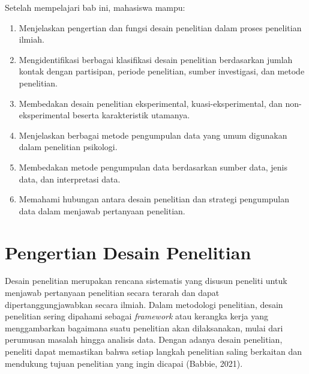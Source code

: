 \documentclass[
  indonesian,
  letterpaper,
  DIV=11,
  numbers=noendperiod]{scrreprt}
\providecommand{\tightlist}{%
  \setlength{\itemsep}{0pt}\setlength{\parskip}{0pt}}
\begin{document}
\begin{tcolorbox}[enhanced jigsaw, colframe=quarto-callout-note-color-frame, toptitle=1mm, breakable, leftrule=.75mm, arc=.35mm, toprule=.15mm, colback=white, colbacktitle=quarto-callout-note-color!10!white, bottomtitle=1mm, bottomrule=.15mm, titlerule=0mm, title=\textcolor{quarto-callout-note-color}{\faInfo}\hspace{0.5em}{Capaian Pembelajaran}, coltitle=black, left=2mm, opacitybacktitle=0.6, opacityback=0, rightrule=.15mm]

Setelah mempelajari bab ini, mahasiswa mampu:

\begin{enumerate}
\def\labelenumi{\arabic{enumi}.}
\tightlist
\item
  Menjelaskan pengertian dan fungsi desain penelitian dalam proses
  penelitian ilmiah.
\item
  Mengidentifikasi berbagai klasifikasi desain penelitian berdasarkan
  jumlah kontak dengan partisipan, periode penelitian, sumber
  investigasi, dan metode penelitian.
\item
  Membedakan desain penelitian eksperimental, kuasi-eksperimental, dan
  non-eksperimental beserta karakteristik utamanya.
\item
  Menjelaskan berbagai metode pengumpulan data yang umum digunakan dalam
  penelitian psikologi.
\item
  Membedakan metode pengumpulan data berdasarkan sumber data, jenis
  data, dan interpretasi data.
\item
  Memahami hubungan antara desain penelitian dan strategi pengumpulan
  data dalam menjawab pertanyaan penelitian.
\end{enumerate}

\end{tcolorbox}

\section{Pengertian Desain
Penelitian}\label{pengertian-desain-penelitian}

Desain penelitian merupakan rencana sistematis yang disusun peneliti
untuk menjawab pertanyaan penelitian secara terarah dan dapat
dipertanggungjawabkan secara ilmiah. Dalam metodologi penelitian, desain
penelitian sering dipahami sebagai \emph{framework} atau kerangka kerja
yang menggambarkan bagaimana suatu penelitian akan dilaksanakan, mulai
dari perumusan masalah hingga analisis data. Dengan adanya desain
penelitian, peneliti dapat memastikan bahwa setiap langkah penelitian
saling berkaitan dan mendukung tujuan penelitian yang ingin dicapai
(Babbie, 2021).
\end{document}
